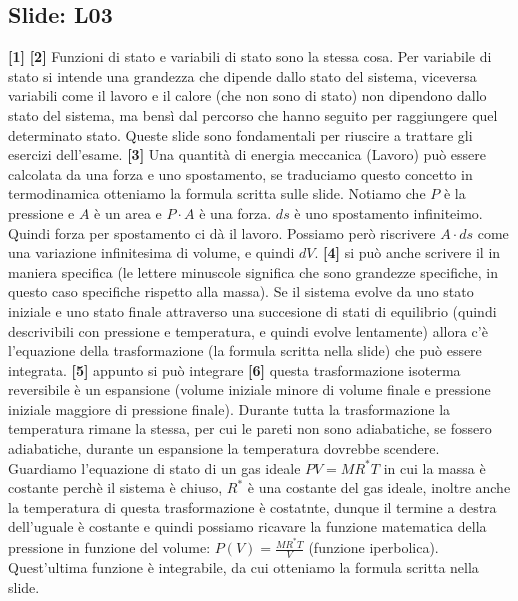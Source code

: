 \subsection*{Slide: L03}
\textbf{[1]}\;
\newline\textbf{[2]}\; Funzioni di stato e variabili di stato sono la stessa cosa. Per variabile di stato si intende una grandezza che dipende dallo stato del sistema, viceversa variabili come il lavoro e il calore (che non sono di stato) non dipendono dallo stato del sistema, ma bensì dal percorso che hanno seguito per raggiungere quel determinato stato. Queste slide sono fondamentali per riuscire a trattare gli esercizi dell'esame.
\newline\textbf{[3]}\; Una quantità di energia meccanica (Lavoro) può essere calcolata da una forza e uno spostamento, se traduciamo questo concetto in termodinamica otteniamo la formula scritta sulle slide. Notiamo che $P$ è la pressione e $A$ è un area e $P \cdot A$ è una forza. $ds$ è uno spostamento infiniteimo. Quindi forza per spostamento ci dà il lavoro. Possiamo però riscrivere $A \cdot ds$ come una variazione infinitesima di volume, e quindi $dV$. 
\newline\textbf{[4]}\; si può anche scrivere il in maniera specifica (le lettere minuscole significa che sono grandezze specifiche, in questo caso specifiche rispetto alla massa). Se il sistema evolve da uno stato iniziale e uno stato finale attraverso una succesione di stati di equilibrio (quindi descrivibili con pressione e temperatura, e quindi evolve lentamente) allora c'è l'equazione della trasformazione (la formula scritta nella slide) che può essere integrata.
\newline\textbf{[5]}\; appunto si può integrare
\newline\textbf{[6]}\; questa trasformazione isoterma reversibile è un espansione (volume iniziale minore di volume finale e pressione iniziale maggiore di pressione finale). Durante tutta la trasformazione la temperatura rimane la stessa, per cui le pareti non sono adiabatiche, se fossero adiabatiche, durante un espansione la temperatura dovrebbe scendere. Guardiamo l'equazione di stato di un gas ideale $PV = MR^{*}T$ in cui la massa è costante perchè il sistema è chiuso, $R^*$ è una costante del gas ideale, inoltre anche la temperatura di questa trasformazione è costatnte, dunque il termine a destra dell'uguale è costante e quindi possiamo ricavare la funzione matematica della pressione in funzione del volume: $P(V) = \frac{MR^*T}{V}$ (funzione iperbolica). Quest'ultima funzione  è integrabile, da cui otteniamo la formula scritta nella slide.
